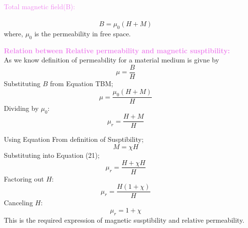 \documentclass{beamer}
\begin{document}
\begin{frame}
\textcolor{violet}{Total magnetic field(B):}\\
\\
\[
B=\mu_0(H+M)
\]
where, $\mu_0$ is the permeability in free space.

\textcolor{violet}{\textbf{Relation between Relative permeability and magnetic susptibility:}}\\
As we know definition of permeability for a material medium is givne by \\
\begin{equation}
    \mu = \frac{B}{H}
\end{equation}
Substituting $B$ from Equation TBM;\\
\[
    \mu = \frac{\mu_0 (H + M)}{H}
\]
Dividing by $\mu_0$:
\begin{equation}
    \mu_r = \frac{H + M}{H}
\end{equation}
    
\end{frame}

\begin{frame}


Using Equation From definition of Susptibility;\\
\[
    M = \chi H
\]
Substituting into Equation (21);
\[
    \mu_r = \frac{H + \chi H}{H}
\]
Factoring out $H$:
\begin{equation}
    \mu_r = \frac{H(1 + \chi)}{H}
\end{equation}
Canceling $H$:
\begin{equation}
    \mu_r = 1 + \chi
\end{equation}
This is the required expression of magnetic susptibility and relative permeability.
\end{frame}
\end{document}
